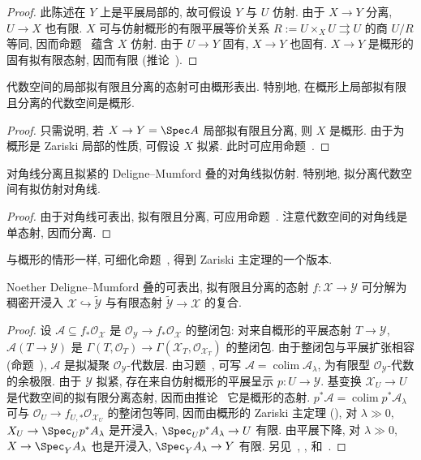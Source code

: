 \begin{proof}
此陈述在 $Y$ 上是平展局部的, 故可假设 $Y$ 与 $U$ 仿射. 由于 $X\to Y$ 分离, $U\to X$ 也有限. $X$ 可与仿射概形的有限平展等价关系 $R:=U\times_X U\rightrightarrows U$ 的商 $U/R$ 等同, 因而命题~ 蕴含 $X$ 仿射. 由于 $U\to Y$ 固有, $X\to Y$ 也固有. $X\to Y$ 是概形的固有拟有限态射, 因而有限 (推论~).
\end{proof}
\begin{corollary}\label{src:5.5.7}
代数空间的局部拟有限且分离的态射可由概形表出. 特别地, 在概形上局部拟有限且分离的代数空间是概形.
\end{corollary}
\begin{proof}
只需说明, 若 $X\to Y=\Spec A$ 局部拟有限且分离, 则 $X$ 是概形. 由于为概形是 Zariski 局部的性质, 可假设 $X$ 拟紧. 此时可应用命题~.
\end{proof}
\begin{corollary}\label{src:5.5.8}
对角线分离且拟紧的 Deligne--Mumford 叠的对角线拟仿射. 特别地, 拟分离代数空间有拟仿射对角线.
\end{corollary}
\begin{proof}
由于对角线可表出, 拟有限且分离, 可应用命题~. 注意代数空间的对角线是单态射, 因而分离.
\end{proof}
与概形的情形一样, 可细化命题~, 得到 Zariski 主定理的一个版本.
\begin{theorem}\label{src:5.5.9}
Noether Deligne--Mumford 叠的可表出, 拟有限且分离的态射 $f:\mathcal X\to\mathcal Y$ 可分解为稠密开浸入 $\mathcal X\hookrightarrow\widetilde{\mathcal Y}$ 与有限态射 $\widetilde{\mathcal Y}\to\mathcal X$ 的复合.
\end{theorem}
\begin{proof}
设 $\mathcal A\subseteq f_*\mathcal O_{\mathcal X}$ 是 $\mathcal O_{\mathcal Y}\to f_*\mathcal O_{\mathcal X}$ 的整闭包: 对来自概形的平展态射 $T\to\mathcal Y$, $\mathcal A(T\to\mathcal Y)$ 是 $\Gamma(T,\mathcal O_T)\to\Gamma(\mathcal X_T,\mathcal O_{\mathcal X_T})$ 的整闭包. 由于整闭包与平展扩张相容 (命题~), $\mathcal A$ 是拟凝聚 $\mathcal O_{\mathcal Y}$-代数层. 由习题~, 可写 $\mathcal A=\operatorname{colim}\mathcal A_\lambda$, 为有限型 $\mathcal O_{\mathcal Y}$-代数的余极限. 由于 $\mathcal Y$ 拟紧, 存在来自仿射概形的平展呈示 $p:U\to\mathcal Y$. 基变换 $\mathcal X_U\to U$ 是代数空间的拟有限分离态射, 因而由推论~ 它是概形的态射. $p^*\mathcal A=\operatorname{colim}p^*\mathcal A_\lambda$ 可与 $\mathcal O_U\to f_{U,*}\mathcal O_{\mathcal X_U}$ 的整闭包等同, 因而由概形的 Zariski 主定理 (), 对 $\lambda\gg0$, $\mathcal X_U\to\Spec_U p^*\mathcal A_\lambda$ 是开浸入, $\Spec_U p^*\mathcal A_\lambda\to U$ 有限. 由平展下降, 对 $\lambda\gg0$, $\mathcal X\to\Spec_{\mathcal Y}\mathcal A_\lambda$ 也是开浸入, $\Spec_{\mathcal Y}\mathcal A_\lambda\to\mathcal Y$ 有限. 另见~\cite[II.6.15]{Knu71}, \cite[定理 A.2]{LMB00}, \cite[定理 $7.2.10$]{Ols16} 和~\cite[Tag 05W7]{SP}.
\end{proof}

